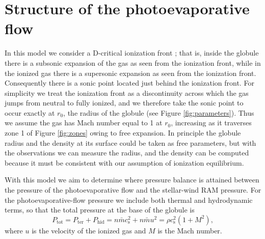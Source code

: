 \documentclass{book}
\begin{document}

\section{Structure of the photoevaporative flow}\label{Estructura}

In this model we consider a D-critical ionization front
\citep{Shuu:1992}; that is, inside the globule there is a subsonic
expansion of the gas as seen from the ionization front, while in the
ionized gas there is a supersonic expansion as seen from the
ionization front. Consequently there is a sonic point located just
behind the ionization front. For simplicity we treat the ionization
front as a discontinuity across which the gas jumps from neutral to
fully ionized, and we therefore take the sonic point to occur exactly
at $r_0$, the radius of the globule (see Figure \ref{fig:parameters}).
Thus we assume the gas has Mach number equal to 1 at $r_0$, increasing
as it traverses zone 1 of Figure \ref{fig:zones} owing to free
expansion. In principle the globule radius and the density at its
surface could be taken as free parameters, but with the observations
we can measure the radius, and the density can be computed because it
must be consistent with our assumption of ionization equilibrium.

With this model we aim to determine where pressure balance is attained
between the pressure of the photoevaporative flow and the stellar-wind
RAM pressure. For the photoevaporative-flow pressure we include both
thermal and hydrodynamic terms, so that the total pressure at the base
of the globule is
\begin{equation}\label{eq: Presion total}
    P_\mathrm{tot}=P_\mathrm{ter}+P_\mathrm{hid}=n\bar{m}c_\mathrm{s}^2+n\bar{m}u^2=\rho c_\mathrm{s}^2(1+M^2),
\end{equation}
where $u$ is the velocity of the ionized gas and $M$ is the Mach
number.
\end{document}
